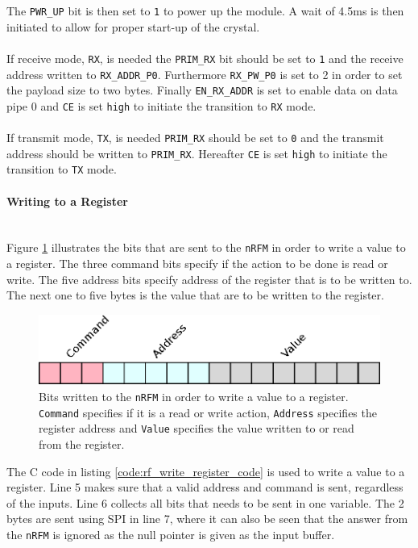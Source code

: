The \texttt{PWR\_UP} bit is then set to \texttt{1} to power up the module. 
A wait of 4.5ms is then initiated to allow for proper start-up of the crystal.
\\~\\
If receive mode, \texttt{RX}, is needed the \texttt{PRIM\_RX} bit should be set to \texttt{1} and the receive address written to \texttt{RX\_ADDR\_P0}.
Furthermore \texttt{RX\_PW\_P0} is set to 2 in order to set the payload size to two bytes.
Finally \texttt{EN\_RX\_ADDR} is set to enable data on data pipe 0 and \texttt{CE} is set \texttt{high} to initiate the transition to \texttt{RX} mode.
\\~\\
If transmit mode, \texttt{TX}, is needed \texttt{PRIM\_RX} should be set to \texttt{0} and the transmit address should be written to \texttt{PRIM\_RX}.
Hereafter \texttt{CE} is set \texttt{high} to initiate the transition to \texttt{TX} mode.

\paragraph{Writing to a Register} %
\label{par:writing_to_a_register}
~\\
Figure \ref{fig:rw_register} illustrates the bits that are sent to the \texttt{nRFM} in order to write a value to a register. 
The three command bits specify if the action to be done is read or write.
The five address bits specify address of the register that is to be written to. 
The next one to five bytes is the value that are to be written to the register.

\begin{figure}[!h]
	\centering
	\includegraphics[width=.5\linewidth]{graphics/rw_register.eps}
	\caption[Writing bits to a register on nRF24L01.]{Bits written to the \texttt{nRFM} in order to write a value to a register. \texttt{Command} specifies if it is a read or write action, \texttt{Address} specifies the register address and \texttt{Value} specifies the value written to or read from the register.}
	\label{fig:rw_register}
\end{figure}

The C code in listing \ref{code:rf_write_register_code} is used to write a value to a register. 
Line 5 makes sure that a valid address and command is sent, regardless of the inputs.
Line 6 collects all bits that needs to be sent in one variable. 
The 2 bytes are sent using SPI in line 7, where it can also be seen that the answer from the \texttt{nRFM} is ignored as the null pointer is given as the input buffer.  

